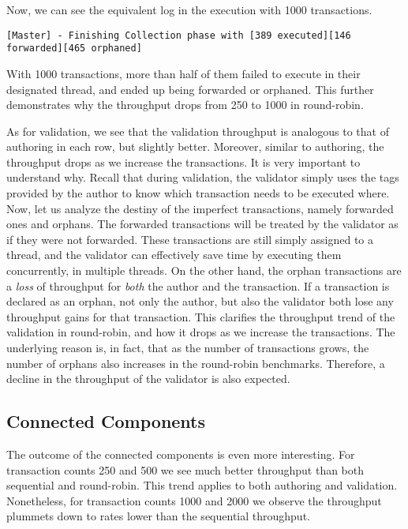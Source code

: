 Now, we can see the equivalent log in the execution with 1000 transactions.

\begin{lstlisting}
[Master] - Finishing Collection phase with [389 executed][146 forwarded][465 orphaned]
\end{lstlisting}

With 1000 transactions, more than half of them failed to execute in their designated thread, and
ended up being forwarded or orphaned. This further demonstrates why the throughput drops from 250 to
1000 in round-robin.

As for validation, we see that the validation throughput is analogous to that of authoring in each row, but slightly better. Moreover, similar to authoring, the throughput drops as we increase the
transactions. It is very important to understand why. Recall that during validation, the validator
simply uses the tags provided by the author to know which transaction needs to be executed where.
Now, let us analyze the destiny of the imperfect transactions, namely forwarded ones and orphans.
The forwarded transactions will be treated by the validator as if they were not forwarded. These
transactions are still simply assigned to a thread, and the validator can effectively save time by
executing them concurrently, in multiple threads. On the other hand, the orphan transactions are a
\textit{loss} of throughput for \textit{both} the author and the transaction. If a transaction is
declared as an orphan, not only the author, but also the validator both lose any throughput gains for
that transaction. This clarifies the throughput trend of the validation in round-robin, and how it
drops as we increase the transactions. The underlying reason is, in fact, that as the number of
transactions grows, the number of orphans also increases in the round-robin benchmarks. Therefore, a
decline in the throughput of the validator is also expected.

\subsection*{Connected Components}
The outcome of the connected components is even more interesting. For transaction counts 250 and 500
we see much better throughput than both sequential and round-robin. This trend applies to both
authoring and validation. Nonetheless, for transaction counts 1000 and 2000 we observe the
throughput plummets down to rates lower than the sequential throughput.

